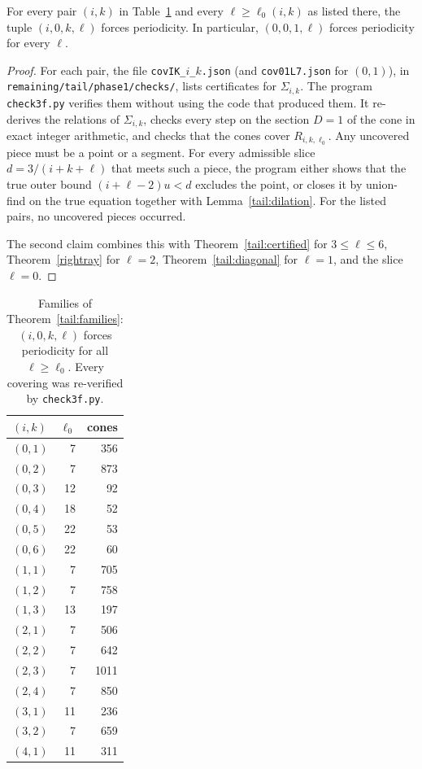 \begin{theorem}\label{tail:families}
For every pair \((i,k)\) in Table~\ref{tab:fam} and every \(\ell\ge\ell_0(i,k)\) as listed there, the tuple \((i,0,k,\ell)\) forces periodicity. In particular, \((0,0,1,\ell)\) forces periodicity for every \(\ell\).
\end{theorem}
\begin{proof}
For each pair, the file \texttt{covIK\_\(i\)\_\(k\).json} (and \texttt{cov01L7.json} for \((0,1)\)), in \texttt{remaining/tail/phase1/checks/}, lists certificates for \(\Sigma_{i,k}\). The program \texttt{check3f.py} verifies them without using the code that produced them. It re-derives the relations of \(\Sigma_{i,k}\), checks every step on the section \(D=1\) of the cone in exact integer arithmetic, and checks that the cones cover \(R_{i,k,\ell_0}\). Any uncovered piece must be a point or a segment. For every admissible slice \(d=3/(i+k+\ell)\) that meets such a piece, the program either shows that the true outer bound \((i+\ell-2)u<d\) excludes the point, or closes it by union-find on the true equation together with Lemma~\ref{tail:dilation}. For the listed pairs, no uncovered pieces occurred.

The second claim combines this with Theorem~\ref{tail:certified} for \(3\le\ell\le6\), Theorem~\ref{rightray} for \(\ell=2\), Theorem~\ref{tail:diagonal} for \(\ell=1\), and the slice \(\ell=0\).
\end{proof}

\begin{table}[ht]\centering\small
\begin{tabular}{lrr}
\toprule
\((i,k)\) & \(\ell_0\) & cones\\
\midrule
\((0,1)\) & 7 & 356\\
\((0,2)\) & 7 & 873\\
\((0,3)\) & 12 & 92\\
\((0,4)\) & 18 & 52\\
\((0,5)\) & 22 & 53\\
\((0,6)\) & 22 & 60\\
\((1,1)\) & 7 & 705\\
\((1,2)\) & 7 & 758\\
\((1,3)\) & 13 & 197\\
\((2,1)\) & 7 & 506\\
\((2,2)\) & 7 & 642\\
\((2,3)\) & 7 & 1011\\
\((2,4)\) & 7 & 850\\
\((3,1)\) & 11 & 236\\
\((3,2)\) & 7 & 659\\
\((4,1)\) & 11 & 311\\
\bottomrule
\end{tabular}
\caption{Families of Theorem~\ref{tail:families}: \((i,0,k,\ell)\) forces periodicity for all \(\ell\ge\ell_0\). Every covering was re-verified by \texttt{check3f.py}.}\label{tab:fam}
\end{table}
